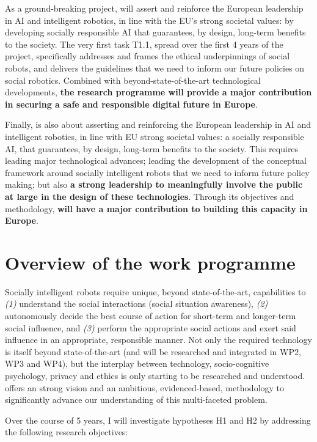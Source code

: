 As a ground-breaking project, \project will assert and reinforce the European leadership in AI and
intelligent robotics, in line with the EU's strong societal values: by developing
socially responsible AI that guarantees, by design, long-term benefits to the
society. The very first task T1.1, spread over the first 4 years of the project,
specifically addresses and frames the ethical underpinnings of social robots,
and delivers the guidelines that we need to inform our future policies on social
robotics. Combined with beyond-state-of-the-art technological developments,
\textbf{the \project research programme will provide a major contribution in
securing a safe and responsible digital future in Europe}. 

Finally, \project is also about asserting and reinforcing the European
leadership in AI and intelligent robotics, in line with EU strong societal
values: a socially responsible AI, that guarantees, by design, long-term
benefits to the society. This requires leading major technological advances;
leading the development of the conceptual framework around socially intelligent
robots that we need to inform future policy making; but also \textbf{a strong
leadership to meaningfully involve the public at large in the design of these
technologies}. Through its objectives and methodology, \textbf{\project will
have a major contribution to building this capacity in Europe}. 


\section{Overview of the \project work programme}

Socially intelligent robots require unique, beyond state-of-the-art,
capabilities to \emph{(1)} understand the social interactions (social
situation awareness), \emph{(2)} autonomously decide the best course of action for
short-term and longer-term social influence, and \emph{(3)} perform the
appropriate social actions and exert said influence in an appropriate,
responsible manner.
Not only the required technology is itself beyond state-of-the-art (and will be
researched and integrated in WP2, WP3 and WP4), but the
interplay between technology, socio-cognitive psychology, privacy and ethics is
only starting to be researched and understood. \project offers an
strong vision and an ambitious, evidenced-based, methodology to significantly
advance our understanding of this multi-faceted problem.

Over the course of 5 years, I will investigate hypotheses H1 and H2
by addressing the following research objectives:


